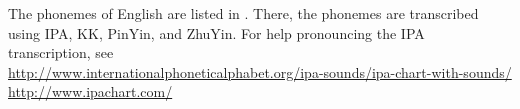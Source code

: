 The phonemes of English are listed in .
There, the phonemes are transcribed using IPA, KK,
PinYin, and ZhuYin.
For help pronouncing the IPA transcription, see
\\\indentx\url{http://www.internationalphoneticalphabet.org/ipa-sounds/ipa-chart-with-sounds/}
\\\indentx\url{http://www.ipachart.com/}
\\
